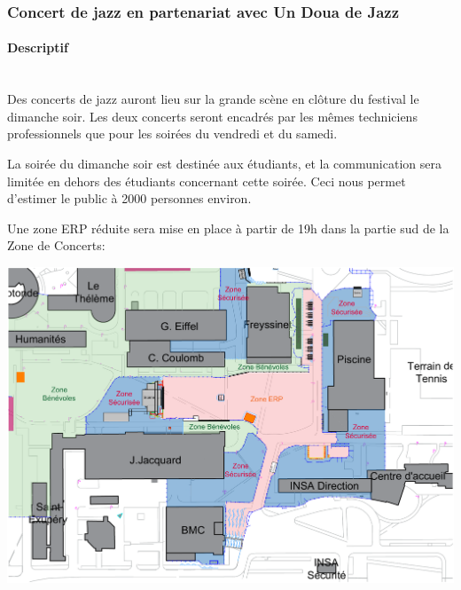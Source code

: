 \documentclass[hidelinks, paper=a4, fontsize=13pt]{report}
\begin{document}
\subsubsection{Concert de jazz en partenariat avec Un Doua de Jazz}

\paragraph{Descriptif}\mbox{}\\
Des concerts de jazz auront lieu sur la grande scène en clôture du festival le dimanche soir. Les deux concerts seront encadrés par les mêmes techniciens professionnels que pour les soirées du vendredi et du samedi. 

La soirée du dimanche soir est destinée aux étudiants, et la communication sera limitée en dehors des étudiants concernant cette soirée. Ceci nous permet d’estimer le public à 2000 personnes environ. 

Une zone ERP réduite sera mise en place à partir de 19h dans la partie sud de la Zone de Concerts:

\begin{center}
\includegraphics[width=.8\textwidth,keepaspectratio]{Exports/Plan_24h_44eme-ERP_Dimanche}

\end{center}
\newpage
\end{document}
